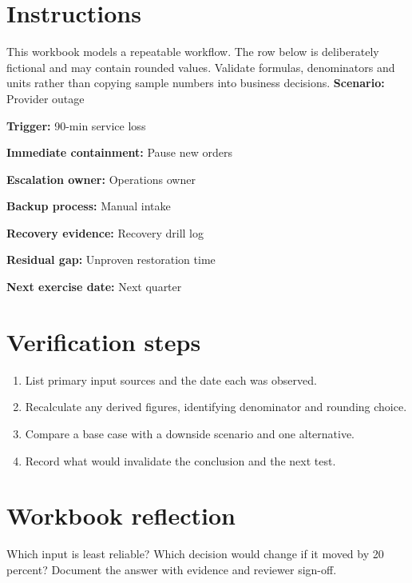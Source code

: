 \documentclass[11pt]{article}
\begin{document}
\SuiteOpen
\section{Instructions}
This workbook models a repeatable workflow. The row below is deliberately fictional and may contain rounded values. Validate formulas, denominators and units rather than copying sample numbers into business decisions.
\noindent\textbf{Scenario:} Provider outage\par\medskip
\noindent\textbf{Trigger:} 90-min service loss\par\medskip
\noindent\textbf{Immediate containment:} Pause new orders\par\medskip
\noindent\textbf{Escalation owner:} Operations owner\par\medskip
\noindent\textbf{Backup process:} Manual intake\par\medskip
\noindent\textbf{Recovery evidence:} Recovery drill log\par\medskip
\noindent\textbf{Residual gap:} Unproven restoration time\par\medskip
\noindent\textbf{Next exercise date:} Next quarter\par\medskip
\section{Verification steps}
\begin{enumerate}[leftmargin=*,itemsep=5pt]
\item List primary input sources and the date each was observed.
\item Recalculate any derived figures, identifying denominator and rounding choice.
\item Compare a base case with a downside scenario and one alternative.
\item Record what would invalidate the conclusion and the next test.
\end{enumerate}

\section{Workbook reflection}
Which input is least reliable? Which decision would change if it moved by 20 percent? Document the answer with evidence and reviewer sign-off.
\end{document}
